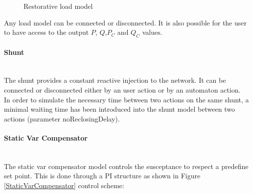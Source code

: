 \documentclass[a4paper, 12pt]{report}
\begin{document}
\begin{figure}[h]
  \setlength{\abovecaptionskip}{15pt}
\centering
\caption{Restorative load model}
\end{figure}

Any load model can be connected or disconnected. It is also possible for the user to have access to the output $P$, $Q$,$ P_C$ and $Q_C$ values. \\

\paragraph{Shunt}
~~\\

The shunt provides a constant reactive injection to the network. It can be connected or disconnected either by an user action or by an automaton action. \\
In order to simulate the necessary time between two actions on the same shunt, a minimal waiting time has been introduced into the shunt model between two actions (parameter noReclosingDelay). \\

\paragraph{Static Var Compensator}
~~\\

The static var compensator model controls the susceptance to respect a predefine set point. This is done through a PI structure as shown in Figure \ref{StaticVarCompensator} control scheme:
\end{document}
